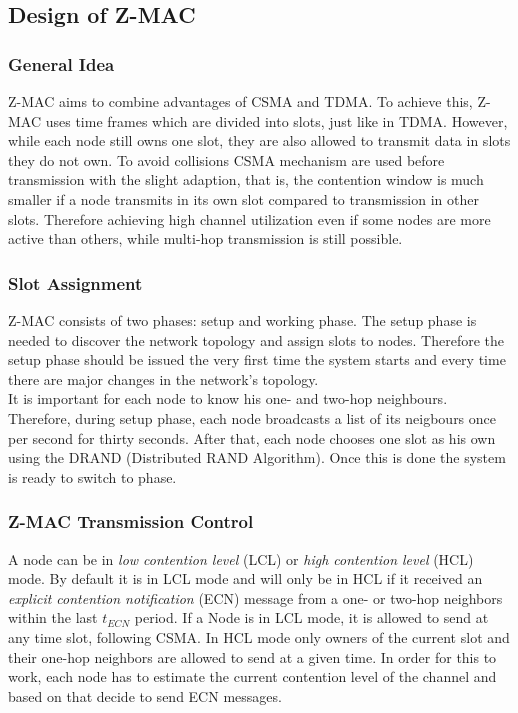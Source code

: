 \subsection{Design of Z-MAC}
\subsubsection{General Idea}
Z-MAC aims to combine advantages of CSMA and TDMA. To achieve this, Z-MAC uses time frames which are divided into slots, just like in TDMA. However, while each node still owns one slot, they are also allowed to transmit data in slots they do not own. To avoid collisions CSMA mechanism are used before transmission with the slight adaption, that is, the contention window is much smaller if a node transmits in its own slot compared to transmission in other slots. Therefore achieving high channel utilization even if some nodes are more active than others, while multi-hop transmission is still possible.\cite{rhee2008z}

\subsubsection{Slot Assignment}
Z-MAC consists of two phases: setup and working phase. The setup phase is needed to discover the network topology and assign slots to nodes. Therefore the setup phase should be issued the very first time the system starts and every time there are major changes in the network's topology.\\
It is important for each node to know his one- and two-hop neighbours. Therefore, during setup phase, each node broadcasts a list of its neigbours once per second for thirty seconds. After that, each node chooses one slot as his own using the DRAND (Distributed RAND Algorithm). Once this is done the system is ready to switch to
phase.

\subsubsection{Z-MAC Transmission Control}
A node can be in \textit{low contention level} (LCL) or \textit{high contention level} (HCL) mode. By default it is in LCL mode and will only be in HCL if it received an \textit{explicit contention notification} (ECN) message from a one- or two-hop neighbors within the last $t_{ECN}$ period. If a Node is in LCL mode, it is allowed to send at any time slot, following CSMA. In HCL mode only owners of the current slot and their one-hop neighbors are allowed to send at a given time. In order for this to work, each node has to estimate the current contention level of the channel and based on that decide to send ECN messages.

